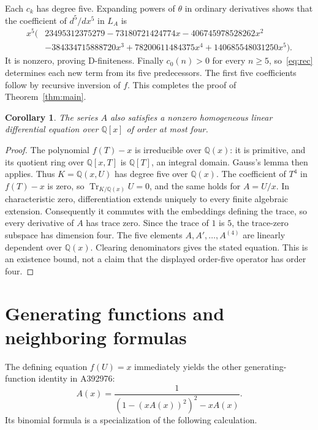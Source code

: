 \documentclass[10pt]{article}
\newtheorem{corollary}[theorem]{Corollary}
\newcommand{\Q}{\mathbb{Q}}
\begin{document}
Each $c_k$ has degree five. Expanding powers of $\theta$ in ordinary
derivatives shows that the coefficient of $d^5/dx^5$ in $L_A$ is
\begin{align*}
 x^5\bigl(&23495312375279-73180721424774x
 -406745978528262x^2\\
 &-384334715888720x^3+78200611484375x^4
 +140685548031250x^5\bigr).
\end{align*}
It is nonzero, proving D-finiteness. Finally $c_0(n)>0$ for every $n\geq5$,
so~\eqref{eq:rec} determines each new term from its five predecessors.
The first five coefficients follow by recursive inversion of $f$.
This completes the proof of Theorem~\ref{thm:main}.

\begin{corollary}\label{cor:order}
The series $A$ also satisfies a nonzero homogeneous linear differential
equation over $\Q[x]$ of order at most four.
\end{corollary}
\begin{proof}
The polynomial $f(T)-x$ is irreducible over $\Q(x)$: it is primitive,
and its quotient ring over $\Q[x,T]$ is $\Q[T]$, an integral domain.
Gauss's lemma then applies. Thus $K=\Q(x,U)$ has degree five over
$\Q(x)$. The coefficient of $T^4$ in $f(T)-x$ is zero, so
$\operatorname{Tr}_{K/\Q(x)}U=0$, and the same holds for $A=U/x$.
In characteristic zero, differentiation extends uniquely to every finite
algebraic extension. Consequently it commutes with the embeddings defining
the trace, so every derivative of $A$ has trace zero. Since the trace of
$1$ is $5$, the trace-zero subspace has dimension four. The five elements
$A,A',\ldots,A^{(4)}$ are linearly dependent over $\Q(x)$.
Clearing denominators gives the stated equation. This is an existence
bound, not a claim that the displayed order-five operator has order four.
\end{proof}

\section{Generating functions and neighboring formulas}

The defining equation $f(U)=x$ immediately yields the other generating-function
identity in A392976:
\begin{equation}\label{eq:gf}
 A(x)=\frac{1}{(1-(xA(x))^2)^2-xA(x)}.
\end{equation}
Its binomial formula is a specialization of the following calculation.
\end{document}
